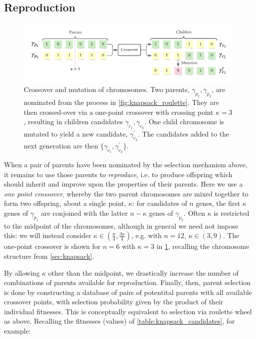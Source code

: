 \subsection{Reproduction}
\label{sec:reproduction}
\begin{figure}
    \begin{center}
        \includegraphics{theoretical_study/figures/chromosomes.pdf}
    \end{center}
    \caption[Crossover and mutation of chromosomes.]{
        Crossover and mutation of chromosomes.
        Two parents, $\gamma_{p_1}, \gamma_{p_2}$, are nominated from the process in \cref{fig:knapsack_roulette}. 
        They are then crossed-over via a one-point crossover with crossing point $\kappa=3$, 
        resulting in children candidates $\gamma_{c_1}, \gamma_{c_2}$. 
        One child chromosome is mutated to yield a new candidate, $\gamma_{c_2}^{\prime}$. 
        The candidates added to the next generation are then $\{ \gamma_{c_1}, \gamma_{c_2}^{\prime} \}$.
    }
    \label{fig:gen_alg_reproduction}
\end{figure}

When a pair of parents have been nominated by the selection mechanism above, 
    it remains to use those parents to \emph{reproduce}, 
    i.e. to produce offspring which should inherit and improve upon the properties of their parents. 
Here we use a \emph{one point crossover}, whereby the two parent chromosomes are mixed together 
    to form two offspring, about a single point, $\kappa$: 
    for candidates of $n$ genes, 
    the first $\kappa$ genes of $\gamma_{p_1}$ are conjoined with the latter $n - \kappa$ genes of $\gamma_{p_2}$. 
Often $\kappa$ is restricted to the midpoint of the chromosomes, although in general we need not impose this: 
    we will instead consider $\kappa \in \left( \frac{n}{4}, \frac{3n}{4} \right)$, 
    e.g. with $n=12$, $\kappa \in (3, 9)$. 
The one-point crossover is shown for $n=6$ with $\kappa=3$ in \cref{fig:gen_alg_reproduction}, 
    recalling the chromosome structure from \cref{sec:knapsack}.
\par 
By allowing $\kappa$ other than the midpoint, we drastically increase the number of combinations of parents available for reproduction. 
Finally, then, parent selection is done by constructing a database of pairs of potentital parents with all available crossover points, 
    with selection probability given by the product of their individual fitnesses. 
This is conceptually equivalent to selection via roulette wheel as above. 
Recalling the fitnesses (values) of \cref{table:knapsack_candidates}, for example: 

